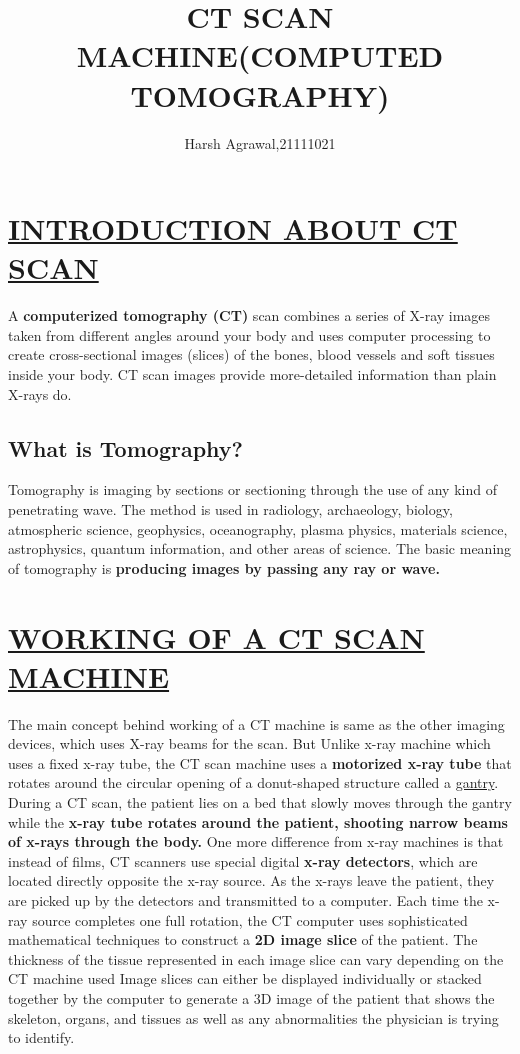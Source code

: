 \documentclass[12pt]{article}
\title {CT SCAN MACHINE(COMPUTED TOMOGRAPHY)}
\author{Harsh Agrawal,21111021}
\begin{document}
\maketitle
\section {\underline{INTRODUCTION ABOUT CT SCAN}}
\raggedright{A \textbf{computerized tomography (CT)} scan combines a series of X-ray images taken from different angles 
around your body and uses computer processing to create cross-sectional images (slices) of the bones,
blood vessels and soft tissues inside your body. CT scan images provide more-detailed information than plain X-rays do.}
\subsection{What is Tomography?}
Tomography is imaging by sections or sectioning through the use of any kind of penetrating wave. The method is used in radiology, archaeology, biology, atmospheric science, geophysics, oceanography, plasma physics, materials science, astrophysics, quantum information, and other areas of science.
The basic meaning of tomography is \textbf{producing images by passing any ray or wave.}
\section{\underline{WORKING OF A CT SCAN MACHINE}}
The main concept behind working of a CT machine is same as the other imaging devices, which uses X-ray beams for the scan. But Unlike x-ray machine which uses a fixed x-ray tube, the CT scan machine uses a \textbf{motorized x-ray tube}  that rotates around the circular opening of a donut-shaped structure called a \underline{gantry}. During a CT scan, the patient lies on a bed that slowly moves through the gantry while the \textbf{x-ray tube rotates around the patient, shooting narrow beams of x-rays through the body.} One more difference from x-ray machines is that instead of films, CT scanners use special digital \textbf{x-ray detectors}, which are located directly opposite the x-ray source. As the x-rays leave the patient, they are picked up by the detectors and transmitted to a computer.
\newline Each time the x-ray source completes one full rotation, the CT computer uses sophisticated mathematical techniques to construct a \textbf{2D image slice} of the patient. The thickness of the tissue represented in each image slice can vary depending on the CT machine used
Image slices can either be displayed individually or stacked together by the computer to generate a 3D image of the patient that shows the skeleton, organs, and tissues as well as any abnormalities the physician is trying to identify.
\end{document}
